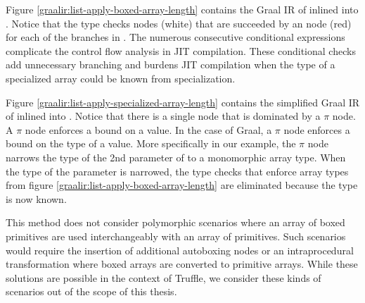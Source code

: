 Figure \ref{graalir:list-apply-boxed-array-length} contains the Graal IR of  inlined into . 
Notice that the  type checks nodes (white) that are succeeded by an  node (red) for each of the branches in .
The numerous consecutive conditional expressions complicate the control flow analysis in JIT compilation.
These conditional checks add unnecessary branching and burdens JIT compilation when the type of a specialized array could be known from specialization.

Figure \ref{graalir:list-apply-specialized-array-length} contains the simplified Graal IR of  inlined into .
Notice that there is a single  node that is dominated by a $\pi$ node.
A $\pi$ node\cite{abdc:pi-nodes} enforces a bound on a value.
In the case of Graal, a $\pi$ node enforces a bound on the type of a value.
More specifically in our example, the $\pi$ node narrows the type of the 2nd parameter of  to a monomorphic array type.
When the type of the parameter is narrowed, the type checks that enforce array types from figure \ref{graalir:list-apply-boxed-array-length} are eliminated because the type is now known.

This method does not consider polymorphic scenarios where an array of boxed primitives are used interchangeably with an array of primitives.
Such scenarios would require the insertion of additional autoboxing nodes or an intraprocedural transformation where boxed arrays are converted to primitive arrays.
While these solutions are possible in the context of Truffle, we consider these kinds of scenarios out of the scope of this thesis.



